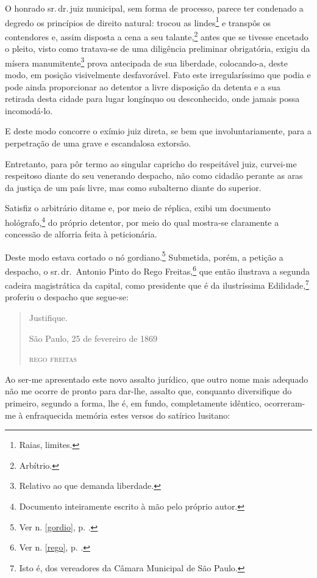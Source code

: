 O honrado sr.\,dr.\,juiz municipal, sem forma de processo, parece ter
condenado a degredo os princípios de direito natural: trocou as
lindes\footnote{Raias, limites.} e transpôs os contendores e, assim
disposta a cena a seu talante,\footnote{Arbítrio.} antes que se
tivesse encetado o pleito, visto como tratava-se de uma diligência
preliminar obrigatória, exigiu da mísera manumitente\footnote{Relativo
  ao que demanda liberdade.} prova antecipada de sua liberdade,
colocando-a, deste modo, em posição visivelmente desfavorável. Fato este
irregularíssimo que podia e pode ainda proporcionar ao detentor a livre
disposição da detenta e a sua retirada desta cidade para lugar longínquo
ou desconhecido, onde jamais possa incomodá-lo.

E deste modo concorre o exímio juiz direta, se bem que
involuntariamente, para a perpetração de uma grave e escandalosa
extorsão.

Entretanto, para pôr termo ao singular capricho do respeitável juiz,
curvei-me respeitoso diante do seu venerando despacho, não como cidadão
perante as aras da justiça de um país livre, mas como subalterno diante
do superior.

Satisfiz o arbitrário ditame e, por meio de réplica, exibi um documento
hológrafo,\footnote{Documento inteiramente escrito à mão pelo próprio
  autor.} do próprio detentor, por meio do qual mostra-se claramente a
concessão de alforria feita à peticionária.

Deste modo estava cortado o nó gordiano.\footnote{Ver n. \ref{gordio}, p. 
\pageref{gordio}.} Submetida, porém, a petição a despacho, o sr.\,dr.~Antonio 
Pinto do Rego Freitas,\footnote{Ver n. \ref{rego}, p. \pageref{rego}.} 
que então ilustrava a segunda cadeira magistrática da capital, como presidente 
que é da ilustríssima Edilidade,\footnote{Isto é, dos vereadores da 
Câmara Municipal de São Paulo.} proferiu o despacho que segue-se:

\begin{quote}
Justifique.

\begin{flushright}
São Paulo, 25 de fevereiro de 1869

\textsc{rego freitas}
\end{flushright}
\end{quote}

Ao ser-me apresentado este novo assalto jurídico, que outro nome mais
adequado não me ocorre de pronto para dar-lhe, assalto que, conquanto
diversifique do primeiro, segundo a forma, lhe é, em fundo,
completamente idêntico, ocorreram-me à enfraquecida memória estes versos
do satírico lusitano:

